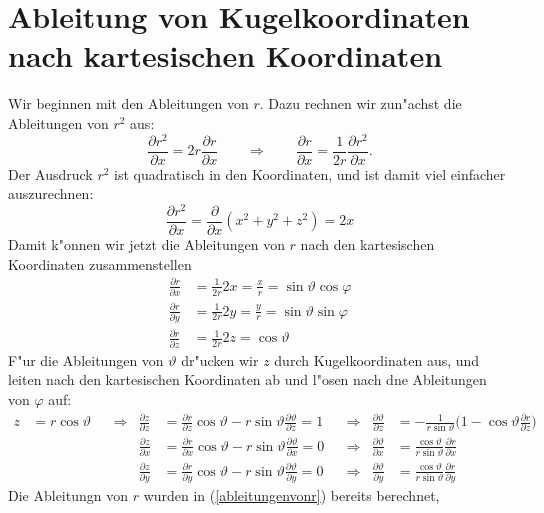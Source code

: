 \section{Ableitung von Kugelkoordinaten nach kartesischen Koordinaten}
Wir beginnen mit den Ableitungen von $r$. Dazu rechnen wir zun"achst die
Ableitungen von $r^2$ aus:
\[
\frac{\partial r^2}{\partial x}
=
2r\frac{\partial r}{\partial x}
\qquad
\Rightarrow
\qquad
\frac{\partial r}{\partial x}
=
\frac1{2r}\frac{\partial r^2}{\partial x}.
\]
Der Ausdruck  $r^2$ ist quadratisch in den Koordinaten, und ist damit
viel einfacher auszurechnen:
\[
\frac{\partial r^2}{\partial x}=\frac{\partial}{\partial x}(x^2+y^2+z^2)=2x
\]
Damit k"onnen wir jetzt die Ableitungen von $r$ nach den kartesischen
Koordinaten zusammenstellen
\begin{equation}
\begin{aligned}
\frac{\partial r}{\partial x}
&=
\frac1{2r}2x=\frac{x}{r}=\sin\vartheta\cos\varphi
\\
\frac{\partial r}{\partial y}
&=
\frac1{2r}2y=\frac{y}{r}=\sin\vartheta\sin\varphi
\\
\frac{\partial r}{\partial z}
&=
\frac1{2r}2z=\cos\vartheta
\end{aligned}
\label{ableitungenvonr}
\end{equation}
F"ur die Ableitungen von $\vartheta$ dr"ucken wir $z$ durch Kugelkoordinaten
aus, und leiten nach den kartesischen Koordinaten ab und l"osen nach dne
Ableitungen von $\varphi$ auf:
\begin{align*}
z&=r\cos\vartheta
&&\Rightarrow&
\frac{\partial z}{\partial z}
&=
\frac{\partial r}{\partial z}\cos\vartheta
-
r \sin\vartheta\frac{\partial \vartheta}{\partial z}
=1
&&\Rightarrow&
\frac{\partial\vartheta}{\partial z}
&=
-\frac1{r\sin\vartheta}
\biggl(1-\cos\vartheta\frac{\partial r}{\partial z}\biggr)
\\
&&&&
\frac{\partial z}{\partial x}
&=
\frac{\partial r}{\partial x}\cos\vartheta
	- r\sin\vartheta\frac{\partial\vartheta}{\partial x}
=0
&&\Rightarrow&
\frac{\partial\vartheta}{\partial x}
&=
\frac{\cos\vartheta}{r\sin\vartheta}\frac{\partial r}{\partial x}
\\
&&&&
\frac{\partial z}{\partial y}
&=
\frac{\partial r}{\partial y}\cos\vartheta
	- r\sin\vartheta\frac{\partial\vartheta}{\partial y}
=0
&&\Rightarrow&
\frac{\partial\vartheta}{\partial y}
&=
\frac{\cos\vartheta}{r\sin\vartheta}\frac{\partial r}{\partial y}
\end{align*}
Die Ableitungn von $r$ wurden in (\ref{ableitungenvonr}) bereits berechnet,
